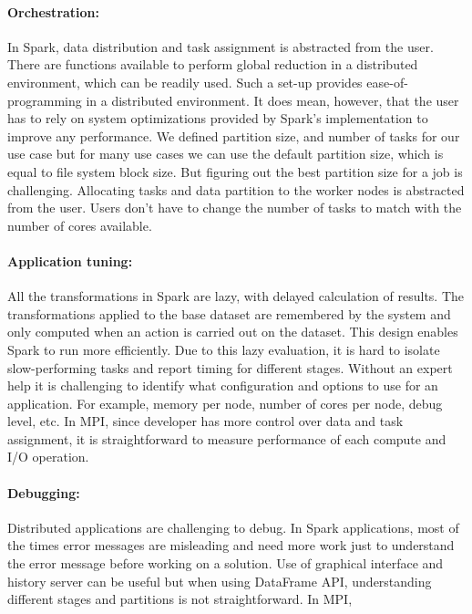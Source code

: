 \documentclass[10pt, twocolumn]{article}
\begin{document}
 \paragraph{Orchestration: } 
In Spark, data distribution and task assignment
  is abstracted from the user. There are functions available to
  perform global reduction in a distributed environment, which can be
  readily used.  Such a set-up provides ease-of-programming in a
  distributed environment. It does mean, however, that the user has to
  rely on system optimizations provided by Spark's implementation to
  improve any performance.
  We defined partition size, and number 
of tasks for our use case but for many use cases we can use the 
default partition size, which is equal to file system block size. 
But figuring out the best partition size for a job is challenging. 
Allocating tasks and data partition to the worker nodes is abstracted 
from the user. Users don't have to change the number of tasks to match 
with the number of cores available. 

  \paragraph{Application tuning: } All the transformations in Spark
  are lazy, with delayed calculation of results. The transformations
  applied to the base dataset are remembered by the system
  and only computed when an action is carried out on the dataset.
  This design enables Spark to run more efficiently. 
  Due to this lazy evaluation, it is hard to isolate slow-performing tasks and report
  timing for different stages. 
  Without an expert help 
it is challenging to identify what configuration and options to use for 
an application. 
For example, memory per node, number of cores per node,
debug level, etc.  
  In MPI, since developer has more control over data and task assignment, it is 
  straightforward to measure performance of each compute and I/O operation.  

\paragraph{Debugging: } 
Distributed applications are challenging to debug. 
In Spark applications, 
most of the times error messages are misleading and need more work
just to understand the error message before working on
a solution. Use of graphical interface and history server can
be useful but when using DataFrame API, understanding
different stages and partitions is not straightforward. 
In MPI, 
\end{document}
